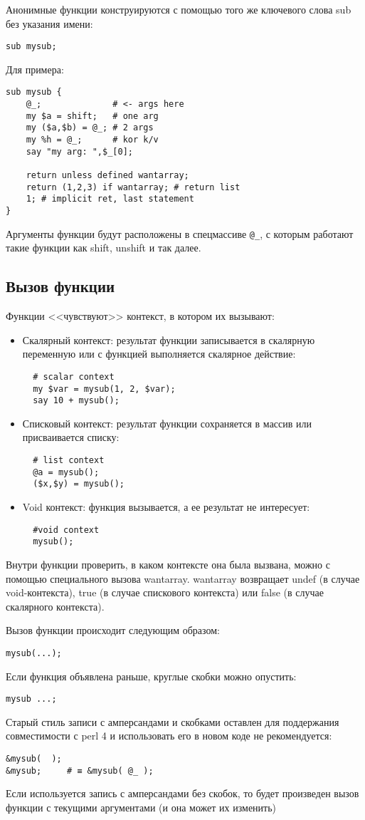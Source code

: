 Анонимные функции конструируются с помощью того же ключевого слова sub без указания имени:
\begin{verbatim}
sub mysub;
\end{verbatim}
Для примера:
\begin{verbatim}
sub mysub {
    @_;              # <- args here
    my $a = shift;   # one arg
    my ($a,$b) = @_; # 2 args
    my %h = @_;      # kor k/v
    say "my arg: ",$_[0];

    return unless defined wantarray;
    return (1,2,3) if wantarray; # return list
    1; # implicit ret, last statement
}
\end{verbatim}
Аргументы функции будут расположены в спецмассиве \verb|@_|, с которым работают такие функции как shift, unshift и так далее.


\subsection{Вызов функции}
Функции <<чувствуют>> контекст, в котором их вызывают:
\begin{itemize}
  \item Скалярный контекст: результат функции записывается в скалярную переменную или с функцией выполняется скалярное действие:
  \begin{verbatim}
  # scalar context
  my $var = mysub(1, 2, $var);
  say 10 + mysub();
  \end{verbatim}
  \item Списковый контекст:  результат функции сохраняется в массив или присваивается списку:
  \begin{verbatim}
  # list context
  @a = mysub();
  ($x,$y) = mysub();
  \end{verbatim}
  \item Void контекст: функция вызывается, а ее результат не интересует:
  \begin{verbatim}
  #void context
  mysub();
  \end{verbatim}
\end{itemize}
Внутри функции проверить, в каком контексте она была вызвана, можно с помощью специального вызова wantarray. wantarray возвращает undef (в случае void-контекста), true (в случае спискового контекста) или false (в случае скалярного контекста).

Вызов функции происходит следующим образом:
\begin{verbatim}
mysub(...);
\end{verbatim}
Если функция объявлена раньше, круглые скобки можно опустить:
\begin{verbatim}
mysub ...;
\end{verbatim}
Старый стиль записи с амперсандами и скобками оставлен для поддержания совместимости с perl 4 и использовать его в новом коде не рекомендуется:
\begin{verbatim}
&mysub(  );
&mysub;     # ≡ &mysub( @_ );
\end{verbatim}
Если используется запись с амперсандами без скобок, то будет произведен вызов функции с текущими аргументами (и она может их изменить)

